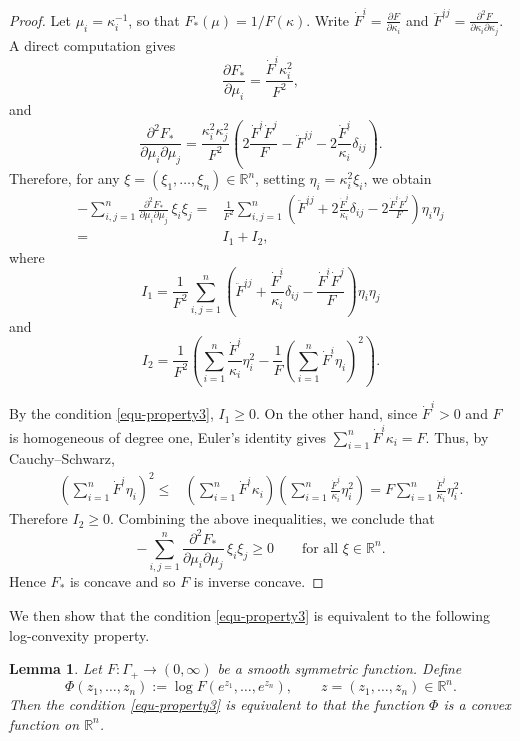 \documentclass[11pt,reqno]{amsart}
\newtheorem{lemma}[proposition]{Lemma}
\theoremstyle{remark}
\numberwithin{equation}{section}
\begin{document}
\begin{proof}
Let $\mu_i=\kappa_i^{-1}$, so that $F_*(\mu)=1/{F(\kappa)}$. Write $\dot{F}^i=\frac{\partial F}{\partial \kappa_i}$ and
$\ddot{F}^{ij}=\frac{\partial^2 F}{\partial \kappa_i\partial \kappa_j}$. A direct computation gives
\[
\frac{\partial F_*}{\partial \mu_i}
=\frac{\dot{F}^i\kappa_i^2}{F^2},
\]
and
\[
\frac{\partial^2 F_*}{\partial \mu_i\partial \mu_j}
=
\frac{\kappa_i^2\kappa_j^2}{F^2}
\left(
2\frac{\dot{F}^i \dot{F}^j}{F}-\ddot{F}^{ij}-2\frac{\dot{F}^i}{\kappa_i}\delta_{ij}
\right).
\]
Therefore, for any $\xi=(\xi_1,\dots,\xi_n)\in \mathbb{R}^n$, setting $\eta_i=\kappa_i^2\xi_i$, we obtain
\begin{align*}
-\sum_{i,j=1}^n \frac{\partial^2 F_*}{\partial \mu_i\partial \mu_j}\,\xi_i\xi_j
=&\frac1{F^2}
\sum_{i,j=1}^n
\left(
\ddot{F}^{ij}+2\frac{\dot{F}^i}{\kappa_i}\delta_{ij}-2\frac{\dot{F}^i \dot{F}^j}{F}
\right)\eta_i\eta_j\\
=& I_1+I_2,
\end{align*}
where
\[
I_1=
\frac1{F^2}\sum_{i,j=1}^n
\left(
\ddot{F}^{ij}+\frac{\dot{F}^i}{\kappa_i}\delta_{ij}-\frac{\dot{F}^i \dot{F}^j}{F}
\right)\eta_i\eta_j
\]
and
\[
I_2=
\frac1{F^2}\left(\sum_{i=1}^n \frac{\dot{F}^i}{\kappa_i}\eta_i^2
-\frac1F\left(\sum_{i=1}^n \dot{F}^i\eta_i\right)^2\right).
\]

By the condition \eqref{equ-property3}, $I_1\ge 0$. On the other hand, since $\dot{F}^i>0$ and $F$ is homogeneous of degree one, Euler's identity gives $\sum_{i=1}^n \dot{F}^i\kappa_i=F$. Thus, by Cauchy--Schwarz,
\begin{align*}
\left(\sum_{i=1}^n \dot{F}^i\eta_i\right)^2
\leq &
\left(\sum_{i=1}^n \dot{F}^i\kappa_i\right)
\left(\sum_{i=1}^n \frac{\dot{F}^i}{\kappa_i}\eta_i^2\right)
=
F\sum_{i=1}^n \frac{\dot{F}^i}{\kappa_i}\eta_i^2.
\end{align*}
Therefore $I_2\ge 0$. Combining the above inequalities, we conclude that
\[
-\sum_{i,j=1}^n \frac{\partial^2 F_*}{\partial \mu_i\partial \mu_j}\,\xi_i\xi_j
\ge 0
\qquad\text{for all }\xi\in \mathbb{R}^n.
\]
Hence  $F_*$ is concave and so $F$ is inverse concave.
\end{proof}

We then show that the condition \eqref{equ-property3} is equivalent to the following log-convexity property. 
\begin{lemma}\label{lem:logF-convex}
Let $F:\Gamma_+\to (0,\infty)$ be a smooth symmetric function. Define
\begin{equation}\label{s3.Phi}
  \Phi(z_1,\dots,z_n):=\log F(e^{z_1},\dots,e^{z_n}),\qquad z=(z_1,\dots,z_n)\in\mathbb{R}^n.  
\end{equation}
Then the condition \eqref{equ-property3} is equivalent to that the function $\Phi$ is a convex function on $\mathbb{R}^n$.
\end{lemma}
\end{document}
